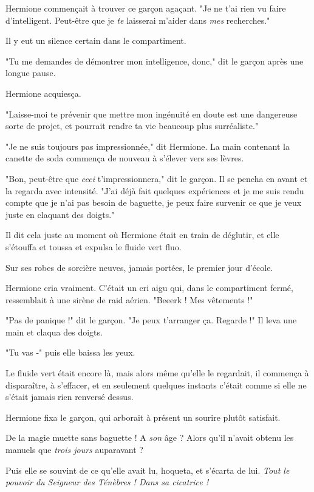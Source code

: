 Hermione commençait à trouver ce garçon agaçant. "Je ne t'ai rien vu faire d'intelligent. Peut-être que je \emph{te}  laisserai m'aider dans \emph{mes}  recherches."

Il y eut un silence certain dans le compartiment.

"Tu me demandes de démontrer mon intelligence, donc," dit le garçon après une longue pause.

Hermione acquiesça.

"Laisse-moi te prévenir que mettre mon ingénuité en doute est une dangereuse sorte de projet, et pourrait rendre ta vie beaucoup plus surréaliste."

"Je ne suis toujours pas impressionnée," dit Hermione. La main contenant la canette de soda commença de nouveau à s'élever vers ses lèvres.

"Bon, peut-être que \emph{ceci}  t'impressionnera," dit le garçon. Il se pencha en avant et la regarda avec intensité. "J'ai déjà fait quelques expériences et je me suis rendu compte que je n'ai pas besoin de baguette, je peux faire survenir ce que je veux juste en claquant des doigts."

Il dit cela juste au moment où Hermione était en train de déglutir, et elle s'étouffa et toussa et expulsa le fluide vert fluo.

Sur ses robes de sorcière neuves, jamais portées, le premier jour d'école.

Hermione cria vraiment. C'était un cri aigu qui, dans le compartiment fermé, ressemblait à une sirène de raid aérien. "Beeerk ! Mes vêtements !"

"Pas de panique !" dit le garçon. "Je peux t'arranger ça. Regarde !" Il leva une main et claqua des doigts.

"Tu vas -" puis elle baissa les yeux.

Le fluide vert était encore là, mais alors même qu'elle le regardait, il commença à disparaître, à s'effacer, et en seulement quelques instants c'était comme si elle ne s'était jamais rien renversé dessus.

Hermione fixa le garçon, qui arborait à présent un sourire plutôt satisfait.

De la magie muette sans baguette ! A \emph{son}  âge ? Alors qu'il n'avait obtenu les manuels que \emph{trois jours}  auparavant ?

Puis elle se souvint de ce qu'elle avait lu, hoqueta, et s'écarta de lui. \emph{Tout le pouvoir du Seigneur des Ténèbres ! Dans sa cicatrice !} 

